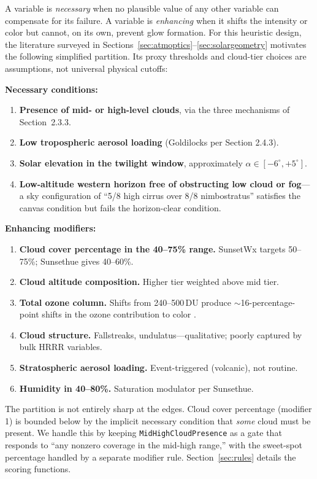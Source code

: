 \documentclass[11pt,a4paper]{article}
\begin{document}
A variable is \emph{necessary} when no plausible value of any other variable can compensate for its failure. A variable is \emph{enhancing} when it shifts the intensity or color but cannot, on its own, prevent glow formation. For this heuristic design, the literature surveyed in Sections~\ref{sec:atmoptics}--\ref{sec:solargeometry} motivates the following simplified partition. Its proxy thresholds and cloud-tier choices are assumptions, not universal physical cutoffs:

\textbf{Necessary conditions:}
\begin{enumerate}
\item \textbf{Presence of mid- or high-level clouds}, via the three mechanisms of Section~2.3.3.
\item \textbf{Low tropospheric aerosol loading} (Goldilocks per Section 2.4.3).
\item \textbf{Solar elevation in the twilight window}, approximately $\alpha \in [-6^\circ, +5^\circ]$.
\item \textbf{Low-altitude western horizon free of obstructing low cloud or fog}---a sky configuration of ``5/8 high cirrus over 8/8 nimbostratus'' satisfies the canvas condition but fails the horizon-clear condition.
\end{enumerate}

\textbf{Enhancing modifiers:}
\begin{enumerate}
\item \textbf{Cloud cover percentage in the 40--75\% range.} SunsetWx targets 50--75\%; Sunsethue gives 40--60\%.
\item \textbf{Cloud altitude composition.} Higher tier weighted above mid tier.
\item \textbf{Total ozone column.} Shifts from 240--500\,DU produce $\sim$16-percentage-point shifts in the ozone contribution to color \citep{lange2023revisiting}.
\item \textbf{Cloud structure.} Fallstreaks, undulatus---qualitative; poorly captured by bulk HRRR variables.
\item \textbf{Stratospheric aerosol loading.} Event-triggered (volcanic), not routine.
\item \textbf{Humidity in 40--80\%.} Saturation modulator per Sunsethue.
\end{enumerate}

The partition is not entirely sharp at the edges. Cloud cover percentage (modifier 1) is bounded below by the implicit necessary condition that \emph{some} cloud must be present. We handle this by keeping \texttt{MidHighCloudPresence} as a gate that responds to ``any nonzero coverage in the mid-high range,'' with the sweet-spot percentage handled by a separate modifier rule. Section~\ref{sec:rules} details the scoring functions.
\end{document}
